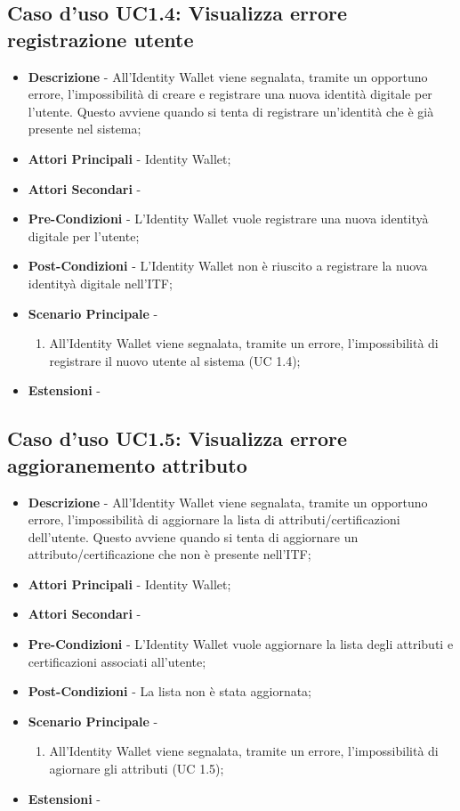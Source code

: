 \subsection{Caso d'uso UC1.4: Visualizza errore registrazione utente}
\begin{itemize}
	\item \textbf{Descrizione} - All'Identity Wallet viene segnalata, tramite un opportuno errore, l'impossibilità di creare e registrare una nuova identità digitale per l'utente. Questo avviene quando si tenta di registrare un'identità che è già presente nel sistema;
	\item \textbf{Attori Principali} - Identity Wallet;
	\item \textbf{Attori Secondari} -
	\item \textbf{Pre-Condizioni} - L'Identity Wallet vuole registrare una nuova identityà digitale per l'utente;
	\item \textbf{Post-Condizioni} - L'Identity Wallet non è riuscito a registrare la nuova identityà digitale nell'\gls{ITF};
	\item \textbf{Scenario Principale} -
	\begin{enumerate}
		\item All'Identity Wallet viene segnalata, tramite un errore, l'impossibilità di registrare il nuovo utente al sistema (UC 1.4);
	\end{enumerate}
	\item \textbf{Estensioni} -
\end{itemize}
\subsection{Caso d'uso UC1.5: Visualizza errore aggioranemento attributo}
\begin{itemize}
	\item \textbf{Descrizione} - All'Identity Wallet viene segnalata, tramite un opportuno errore, l'impossibilità di aggiornare la lista di attributi/certificazioni dell'utente. Questo avviene quando si tenta di aggiornare un attributo/certificazione che non è presente nell'\gls{ITF};
	\item \textbf{Attori Principali} - Identity Wallet;
	\item \textbf{Attori Secondari} -
	\item \textbf{Pre-Condizioni} - L'Identity Wallet vuole aggiornare la lista degli attributi e certificazioni associati all'utente;
	\item \textbf{Post-Condizioni} - La lista non è stata aggiornata;
	\item \textbf{Scenario Principale} -
	\begin{enumerate}
		\item All'Identity Wallet viene segnalata, tramite un errore, l'impossibilità di agiornare gli attributi (UC 1.5);
	\end{enumerate}
	\item \textbf{Estensioni} -
\end{itemize}
\newpage

